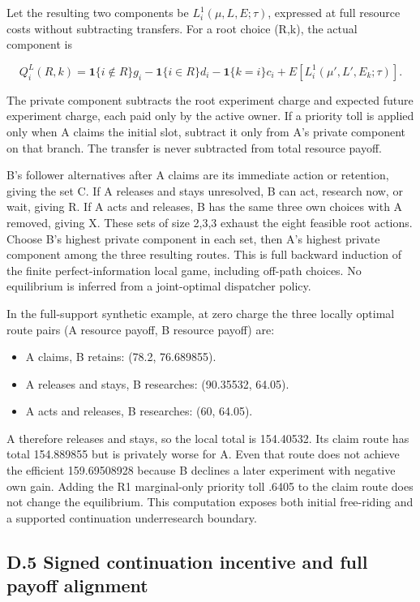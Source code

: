\documentclass[
  11pt,
]{article}
\providecommand{\tightlist}{%
  \setlength{\itemsep}{0pt}\setlength{\parskip}{0pt}}
\begin{document}
Let the resulting two components be \(L_i^1(\mu,L,E;\tau)\), expressed
at full resource costs without subtracting transfers. For a root choice
(R,k), the actual component is

\[Q_i^L(R,k)=\mathbf1\{i\notin R\}g_i
-\mathbf1\{i\in R\}d_i-\mathbf1\{k=i\}c_i
+E[L_i^1(\mu',L',E_k;\tau)].\]

The private component subtracts the root experiment charge and expected
future experiment charge, each paid only by the active owner. If a
priority toll is applied only when A claims the initial slot, subtract
it only from A's private component on that branch. The transfer is never
subtracted from total resource payoff.

B's follower alternatives after A claims are its immediate action or
retention, giving the set C. If A releases and stays unresolved, B can
act, research now, or wait, giving R. If A acts and releases, B has the
same three own choices with A removed, giving X. These sets of size
2,3,3 exhaust the eight feasible root actions. Choose B's highest
private component in each set, then A's highest private component among
the three resulting routes. This is full backward induction of the
finite perfect-information local game, including off-path choices. No
equilibrium is inferred from a joint-optimal dispatcher policy.

In the full-support synthetic example, at zero charge the three locally
optimal route pairs (A resource payoff, B resource payoff) are:

\begin{itemize}
\tightlist
\item
  A claims, B retains: (78.2, 76.689855).
\item
  A releases and stays, B researches: (90.35532, 64.05).
\item
  A acts and releases, B researches: (60, 64.05).
\end{itemize}

A therefore releases and stays, so the local total is 154.40532. Its
claim route has total 154.889855 but is privately worse for A. Even that
route does not achieve the efficient 159.69508928 because B declines a
later experiment with negative own gain. Adding the R1 marginal-only
priority toll .6405 to the claim route does not change the equilibrium.
This computation exposes both initial free-riding and a supported
continuation underresearch boundary.

\subsection{D.5 Signed continuation incentive and full payoff
alignment}\label{d.5-signed-continuation-incentive-and-full-payoff-alignment}
\end{document}
